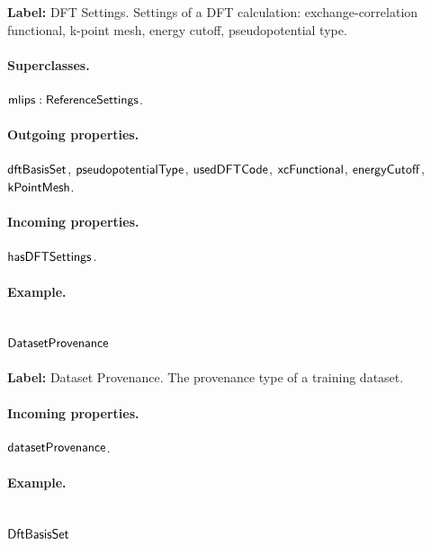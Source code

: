 \textbf{Label:} DFT Settings.
Settings of a DFT calculation: exchange-correlation functional, k-point mesh, energy cutoff, pseudopotential type.

\paragraph{Superclasses.} $\mathsf{mlips:ReferenceSettings}$.

\paragraph{Outgoing properties.} $\mathsf{dftBasisSet}$, $\mathsf{pseudopotentialType}$, $\mathsf{usedDFTCode}$, $\mathsf{xcFunctional}$, $\mathsf{energyCutoff}$, $\mathsf{kPointMesh}$.

\paragraph{Incoming properties.} $\mathsf{hasDFTSettings}$.

\paragraph{Example.}

\subsection{$\mathsf{DatasetProvenance}$}
\label{sec:term-DatasetProvenance}

\textbf{Label:} Dataset Provenance.
The provenance type of a training dataset.

\paragraph{Incoming properties.} $\mathsf{datasetProvenance}$.

\paragraph{Example.}

\subsection{$\mathsf{DftBasisSet}$}
\label{sec:term-DftBasisSet}

